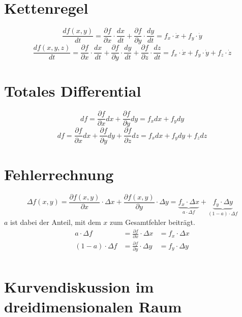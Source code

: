 \section{Kettenregel}
\[ \boxed{\frac{d f(x,y)}{d t} 
= \frac{\partial f}{\partial x} \cdot \frac{d x}{d t} 
+ \frac{\partial f}{\partial y} \cdot \frac{d y}{d t} 
= f_x \cdot \dot{x} + f_y \cdot \dot{y}} \]
\[ \boxed{\frac{d f(x,y,z)}{d t} 
= \frac{\partial f}{\partial x} \cdot \frac{d x}{d t} 
+ \frac{\partial f}{\partial y} \cdot \frac{d y}{d t} 
+ \frac{\partial f}{\partial z} \cdot \frac{d z}{d t} 
= f_x \cdot \dot{x} + f_y \cdot \dot{y} + f_z \cdot \dot{z}} \]

\section{Totales Differential}
\[ \boxed{d f 
= \frac{\partial f}{\partial x} dx + \frac{\partial f}{\partial y} dy 
= f_x dx + f_y dy} \]
\[ \boxed{d f = \frac{\partial f}{\partial x} dx 
+ \frac{\partial f}{\partial y} dy + \frac{\partial f}{\partial z} dz 
= f_x dx + f_y dy + f_z dz} \]

\section{Fehlerrechnung}
\[ \boxed{\Delta f(x,y) = \frac{\partial f(x,y)}{\partial x} \cdot \Delta x 
+ \frac{\partial f(x,y)}{\partial y} \cdot \Delta y 
= \underbrace{f_x \cdot \Delta x}_{a \cdot \Delta f} 
+ \underbrace{f_y \cdot \Delta y}_{(1 - a) \cdot \Delta f}} \]
$a$ ist dabei der Anteil, mit dem $x$ zum Gesamtfehler beiträgt. 
\[ \boxed{\begin{array}{rll}
a \cdot \Delta f        &= \frac{\partial f}{\partial x} \cdot \Delta x 
&= f_x \cdot \Delta x \\
(1 - a) \cdot \Delta f  &= \frac{\partial f}{\partial y} \cdot \Delta y 
&= f_y \cdot \Delta y \\
\end{array}} \]

\newpage

\section{Kurvendiskussion im dreidimensionalen Raum}

